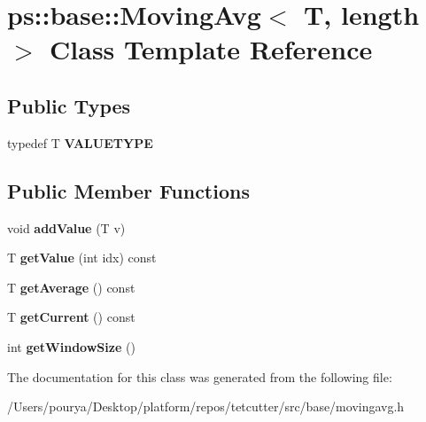 \hypertarget{classps_1_1base_1_1MovingAvg}{}\section{ps\+:\+:base\+:\+:Moving\+Avg$<$ T, length $>$ Class Template Reference}
\label{classps_1_1base_1_1MovingAvg}
\subsection*{Public Types}
\begin{DoxyCompactItemize}
\item 
\hypertarget{classps_1_1base_1_1MovingAvg_ac2b80dc299c74872fd6aebd26ac30594}{}typedef T {\bfseries V\+A\+L\+U\+E\+T\+Y\+P\+E}\label{classps_1_1base_1_1MovingAvg_ac2b80dc299c74872fd6aebd26ac30594}

\end{DoxyCompactItemize}
\subsection*{Public Member Functions}
\begin{DoxyCompactItemize}
\item 
\hypertarget{classps_1_1base_1_1MovingAvg_a53892c1576ce47fba201a9d5fe77ad2b}{}void {\bfseries add\+Value} (T v)\label{classps_1_1base_1_1MovingAvg_a53892c1576ce47fba201a9d5fe77ad2b}

\item 
\hypertarget{classps_1_1base_1_1MovingAvg_a855a97e7b46d6ede2caa4c79edfef6fc}{}T {\bfseries get\+Value} (int idx) const \label{classps_1_1base_1_1MovingAvg_a855a97e7b46d6ede2caa4c79edfef6fc}

\item 
\hypertarget{classps_1_1base_1_1MovingAvg_ac56814bf4f62bdb3e91a09d8def83567}{}T {\bfseries get\+Average} () const \label{classps_1_1base_1_1MovingAvg_ac56814bf4f62bdb3e91a09d8def83567}

\item 
\hypertarget{classps_1_1base_1_1MovingAvg_abd2fa9d8a6a40f25cf788bcbcc0b2c9f}{}T {\bfseries get\+Current} () const \label{classps_1_1base_1_1MovingAvg_abd2fa9d8a6a40f25cf788bcbcc0b2c9f}

\item 
\hypertarget{classps_1_1base_1_1MovingAvg_a23b828dec96570a0f660b16a4933ffce}{}int {\bfseries get\+Window\+Size} ()\label{classps_1_1base_1_1MovingAvg_a23b828dec96570a0f660b16a4933ffce}

\end{DoxyCompactItemize}


The documentation for this class was generated from the following file\+:\begin{DoxyCompactItemize}
\item 
/\+Users/pourya/\+Desktop/platform/repos/tetcutter/src/base/movingavg.\+h\end{DoxyCompactItemize}
